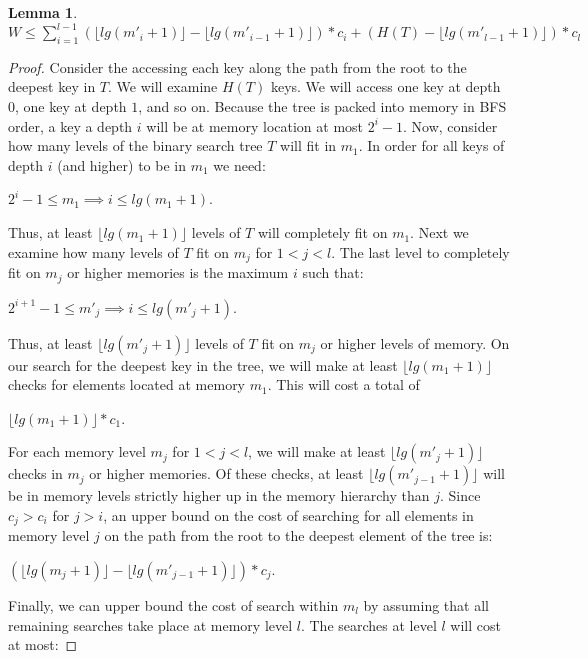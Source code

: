 \documentclass[letterpaper,12pt,titlepage,oneside,final]{book}
\theoremstyle{plain}
\newtheorem{lem}[thm]{Lemma}
\begin{document}
\begin{lem} \label{452} \hspace{1cm} \\
$W \leq \sum_{i=1}^{l-1} (\lfloor lg(m'_i+1) \rfloor - \lfloor lg(m'_{i-1}+1) \rfloor)*c_i+ (H(T) - \lfloor lg(m'_{l-1}+1) \rfloor)*c_l$
\end{lem}


\begin{proof}
Consider the accessing each key along the path from the root to the deepest key in $T$. We will examine $H(T)$ keys. We will access one key at depth $0$, one key at depth $1$, and so on. Because the tree is packed into memory in BFS order, a key a depth $i$ will be at memory location at most $2^i-1$. Now, consider how many levels of the binary search tree $T$ will fit in $m_1$. In order for all keys of depth $i$ (and higher) to be in $m_1$ we need:
\begin{center}
$2^i-1 \leq m_1 \implies i \leq lg(m_1 + 1)$.
\end{center}
Thus, at least $\lfloor lg(m_1 + 1) \rfloor$ levels of $T$ will completely fit on $m_1$. Next we examine how many levels of $T$ fit on $m_j$ for $1 < j < l$. The last level to completely fit on $m_j$ or higher memories is the maximum $i$ such that:
\begin{center}
$2^{i+1}-1 \leq m'_j \implies i \leq lg(m'_j + 1)$.
\end{center}
Thus, at least $\lfloor lg(m'_j + 1) \rfloor$ levels of $T$ fit on $m_j$ or higher levels of memory.
On our search for the deepest key in the tree, we will make at least $\lfloor lg(m_1 + 1) \rfloor$ checks for elements located at memory $m_1$. This will cost a total of
\begin{center}
$\lfloor lg(m_1 + 1) \rfloor * c_1$.
\end{center}
For each memory level $m_j$ for $1 < j < l$, we will make at least $\lfloor lg(m'_j + 1) \rfloor$ checks in $m_j$ or higher memories. Of these checks, at least $\lfloor lg(m'_{j-1} + 1) \rfloor$ will be in memory levels strictly higher up in the memory hierarchy than $j$. Since $c_j > c_i$ for $j > i$, an upper bound on the cost of searching for all elements in memory level $j$ on the path from the root to the deepest element of the tree is:
\begin{center}
$(\lfloor lg(m_j + 1) \rfloor - \lfloor lg(m'_{j-1} + 1) \rfloor) * c_j$.\\
\end{center}
Finally, we can upper bound the cost of search within $m_l$ by assuming that all remaining searches take place at memory level $l$. The searches at level $l$ will cost at most:


\end{proof}
\end{document}
